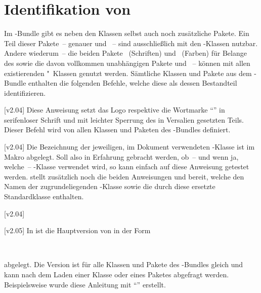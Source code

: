 \section{Identifikation von \TUDScript}
%
\begin{Entity}{}
Im \TUDScript-Bundle gibt es neben den Klassen selbst auch noch zusätzliche 
Pakete. Ein Teil dieser Pakete~-- genauer  und 
~-- sind ausschließlich mit den \TUDScript-Klassen nutzbar.
Andere wiederum~-- die beiden Pakete ~(Schriften) und 
~(Farben) für Belange des \CDs sowie die davon vollkommen 
unabhängigen Pakete  und ~-- können mit 
allen existierenden "~Klassen genutzt werden. Sämtliche Klassen 
und Pakete aus dem \TUDScript-Bundle enthalten die folgenden Befehle, welche 
diese als dessen Bestandteil identifizieren.

\begin{Declaration}
  {}
  [v2.04]
\printdeclarationlist
%
Diese Anweisung setzt das Logo respektive die Wortmarke \enquote{\TUDScript{}} 
in serifenloser Schrift und mit leichter Sperrung des in Versalien gesetzten 
Teils. Dieser Befehl wird von allen Klassen und Paketen des \TUDScript-Bundles 
definiert.
\end{Declaration}

\begin{Declaration}
  {}
  [v2.04]
\printdeclarationlist
%
Die Bezeichnung der jeweiligen, im Dokument verwendeten \TUDScript-Klasse ist 
im Makro  abgelegt. Soll also in Erfahrung gebracht 
werden, ob~-- und wenn ja, welche~-- \TUDScript-Klasse verwendet wird, so kann 
einfach auf diese Anweisung getestet werden. \KOMAScript stellt zusätzlich 
noch die beiden Anweisungen  und  
bereit, welche den Namen der zugrundeliegenden \KOMAScript-Klasse sowie die 
durch diese ersetzte Standardklasse enthalten.
\end{Declaration}

\begin{Declaration}
  {}
  [v2.04]
\begin{Declaration}
  {}
  [v2.05]
\printdeclarationlist
%
In  ist die Hauptversion von \TUDScript in der Form
\begin{quoting}
~~
\end{quoting}
abgelegt. Die Version ist für alle Klassen und Pakete des \TUDScript-Bundles
gleich und kann nach dem Laden einer Klasse oder eines Paketes abgefragt 
werden. Beispielsweise wurde diese Anleitung mit \enquote{\TUDScriptVersion{}} 
erstellt.


\end{Declaration}
\end{Declaration}
\end{Entity}
